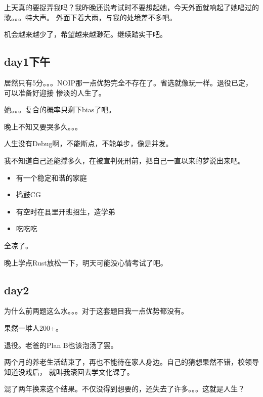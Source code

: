 上天真的要捉弄我吗？我昨晚还说考试时不要想起她，今天外面就响起了她唱过的歌。。。特大声。
外面下着大雨，与我的处境差不多吧。

机会越来越少了，希望越来越渺茫。继续踏实干吧。
\subsection{day1下午}
居然只有5分。。。NOIP那一点优势完全不存在了。省选就像玩一样。退役已定，可以准备好迎接
惨淡的人生了。

她。。。复合的概率只剩下bias了吧。

晚上不知又要哭多久。。。

人生没有Debug啊，不能断点，不能单步，像是并发。

我不知道自己还能撑多久，在被宣判死刑前，把自己一直以来的梦说出来吧。

\begin{itemize}
    \item 有一个稳定和谐的家庭
    \item 捣鼓CG
    \item 有空时在县里开班招生，造学弟
    \item 吃吃吃
\end{itemize}

全凉了。

晚上学点Rust放松一下，明天可能没心情考试了吧。
\subsection{day2}
为什么前两题这么水。。。对于这套题目我一点优势都没有。

果然一堆人200+。

退役。老爸的Plan B也该泡汤了罢。

两个月的养老生活结束了，再也不能待在家人身边。自己的猜想果然不错，校领导知道没戏后，
就叫我滚回去学文化课了。

混了两年换来这个结果。不仅没得到想要的，还失去了许多。。。这就是人生？
